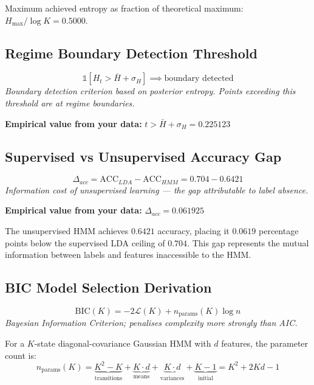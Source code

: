 \documentclass[12pt]{article}
\begin{document}
Maximum achieved entropy as fraction of theoretical maximum: $H_{\max} / \log K = 0.5000$.



\subsection{Regime Boundary Detection Threshold}

\begin{equation}
\mathbb{1}[H_t > \bar{H} + \sigma_H]\implies \text{boundary detected}
\end{equation}
\noindent\textit{Boundary detection criterion based on posterior entropy. Points exceeding this threshold are at regime boundaries.}

\noindent\textbf{Empirical value from your data:} $t > \bar{H} + \sigma_H = 0.225123$



\subsection{Supervised vs Unsupervised Accuracy Gap}

\begin{equation}
\Delta_{acc} = \mathrm{ACC}_{LDA} - \mathrm{ACC}_{HMM} = 0.704 - 0.6421
\end{equation}
\noindent\textit{Information cost of unsupervised learning — the gap attributable to label absence.}

\noindent\textbf{Empirical value from your data:} $\Delta_{acc} = 0.061925$


\noindent The unsupervised HMM achieves $0.6421$ accuracy, placing it $0.0619$ percentage points below the supervised LDA ceiling of $0.704$. This gap represents the mutual information between labels and features inaccessible to the HMM.



\subsection{BIC Model Selection Derivation}

\begin{equation}
\mathrm{BIC}(K) = -2\mathcal{L}(K) + n_{\mathrm{params}}(K)\log n
\end{equation}
\noindent\textit{Bayesian Information Criterion; penalises complexity more strongly than AIC.}



\noindent For a $K$-state diagonal-covariance Gaussian HMM with
$d$ features, the parameter count is:
\begin{equation}
n_{\mathrm{params}}(K) =
\underbrace{K^2 - K}_{\text{transitions}}
+ \underbrace{K \cdot d}_{\text{means}}
+ \underbrace{K \cdot d}_{\text{variances}}
+ \underbrace{K-1}_{\text{initial}}
= K^2 + 2Kd - 1
\end{equation}
\end{document}

